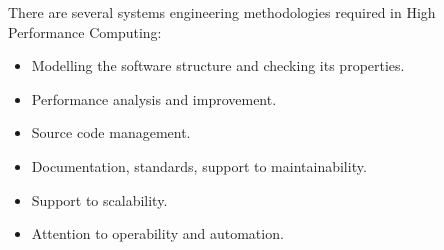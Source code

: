 There are several systems engineering methodologies required in High Performance Computing:
\begin{itemize}
    \item Modelling the software structure and checking its properties.
    
    \item Performance analysis and improvement.
    
    \item Source code management.
    
    \item Documentation, standards, support to maintainability.
    
    \item Support to scalability.
    
    \item Attention to operability and automation.
\end{itemize}